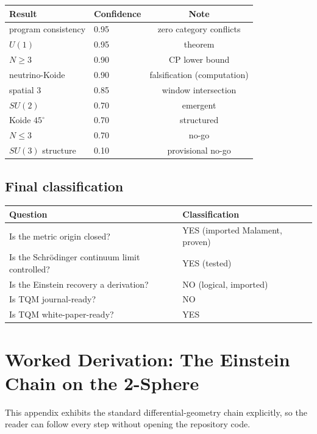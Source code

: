 \documentclass[10pt,twoside,openany]{book}
\begin{document}
\begin{center}
\begin{tabular}{llc}
\toprule
Result & Confidence & Note \\
\midrule
program consistency & 0.95 & zero category conflicts \\
$U(1)$ & 0.95 & theorem \\
$N\ge3$ & 0.90 & CP lower bound \\
neutrino-Koide & 0.90 & falsification (computation) \\
spatial 3 & 0.85 & window intersection \\
$SU(2)$ & 0.70 & emergent \\
Koide $45^\circ$ & 0.70 & structured \\
$N\le3$ & 0.70 & no-go \\
$SU(3)$ structure & 0.10 & provisional no-go \\
\bottomrule
\end{tabular}
\end{center}

\section{Final classification}

\begin{center}
\begin{tabular}{ll}
\toprule
Question & Classification \\
\midrule
Is the metric origin closed? & YES (imported Malament, proven) \\
Is the Schr\"odinger continuum limit controlled? & YES (tested) \\
Is the Einstein recovery a derivation? & NO (logical, imported) \\
Is TQM journal-ready? & NO \\
Is TQM white-paper-ready? & YES \\
\bottomrule
\end{tabular}
\end{center}


\chapter{Worked Derivation: The Einstein Chain on the 2-Sphere}
\label{app:worked}

This appendix exhibits the standard differential-geometry chain explicitly, so the reader
can follow every step without opening the repository code.
\end{document}
